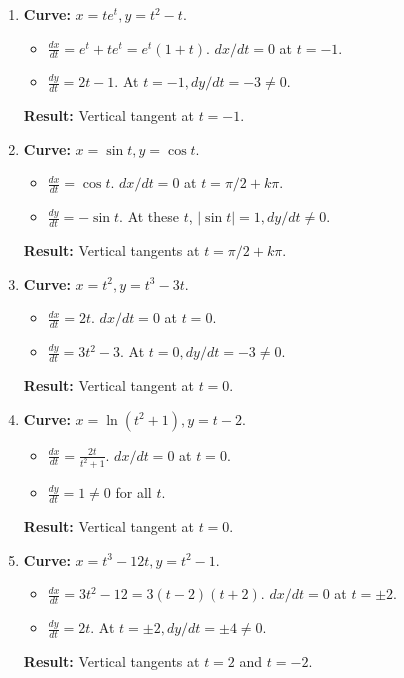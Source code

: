 \documentclass[12pt]{article}
\begin{document}
\begin{enumerate}
    \item \textbf{Curve:} $x=t e^t, y=t^2-t$.
    \begin{itemize}
        \item $\frac{dx}{dt}=e^t+te^t=e^t(1+t)$. $dx/dt=0$ at $t=-1$.
        \item $\frac{dy}{dt}=2t-1$. At $t=-1, dy/dt=-3 \ne 0$.
    \end{itemize}
    \textbf{Result:} Vertical tangent at $t=-1$.

    \item \textbf{Curve:} $x=\sin t, y=\cos t$.
    \begin{itemize}
        \item $\frac{dx}{dt}=\cos t$. $dx/dt=0$ at $t=\pi/2+k\pi$.
        \item $\frac{dy}{dt}=-\sin t$. At these $t$, $|\sin t|=1, dy/dt \ne 0$.
    \end{itemize}
    \textbf{Result:} Vertical tangents at $t=\pi/2+k\pi$.

    \item \textbf{Curve:} $x=t^2, y=t^3-3t$.
    \begin{itemize}
        \item $\frac{dx}{dt}=2t$. $dx/dt=0$ at $t=0$.
        \item $\frac{dy}{dt}=3t^2-3$. At $t=0, dy/dt=-3 \ne 0$.
    \end{itemize}
    \textbf{Result:} Vertical tangent at $t=0$.

    \item \textbf{Curve:} $x=\ln(t^2+1), y=t-2$.
    \begin{itemize}
        \item $\frac{dx}{dt}=\frac{2t}{t^2+1}$. $dx/dt=0$ at $t=0$.
        \item $\frac{dy}{dt}=1 \ne 0$ for all $t$.
    \end{itemize}
    \textbf{Result:} Vertical tangent at $t=0$.

    \item \textbf{Curve:} $x=t^3-12t, y=t^2-1$.
    \begin{itemize}
        \item $\frac{dx}{dt}=3t^2-12=3(t-2)(t+2)$. $dx/dt=0$ at $t=\pm 2$.
        \item $\frac{dy}{dt}=2t$. At $t=\pm 2, dy/dt=\pm 4 \ne 0$.
    \end{itemize}
    \textbf{Result:} Vertical tangents at $t=2$ and $t=-2$.
\end{enumerate}
\end{document}
